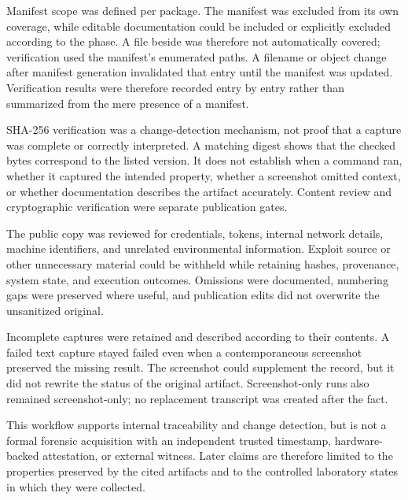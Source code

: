 Manifest scope was defined per package. The manifest was excluded from its own
coverage, while editable documentation could be included or explicitly
excluded according to the phase. A file beside
 was therefore not automatically covered;
verification used the manifest's enumerated paths. A filename or object change
after manifest generation invalidated that entry until the manifest was updated.
Verification results were therefore recorded entry by entry rather than
summarized from the mere presence of a manifest.

SHA-256 verification was a change-detection mechanism, not proof that a capture
was complete or correctly interpreted. A matching digest shows that the checked
bytes correspond to the listed version. It does not establish when a command
ran, whether it captured the intended property, whether a screenshot omitted
context, or whether documentation describes the artifact accurately. Content
review and cryptographic verification were separate publication gates.

The public copy was reviewed for credentials, tokens, internal network details,
machine identifiers, and unrelated environmental information. Exploit source
or other unnecessary material could be withheld while retaining hashes,
provenance, system state, and execution outcomes. Omissions were documented,
numbering gaps were preserved where useful, and publication edits did not
overwrite the unsanitized original.

Incomplete captures were retained and described according to their contents. A
failed text capture stayed failed even when a contemporaneous screenshot
preserved the missing result. The screenshot could supplement the record, but
it did not rewrite the status of the original artifact. Screenshot-only runs
also remained screenshot-only; no replacement transcript was created after the
fact.

This workflow supports internal traceability and change detection, but is not a
formal forensic acquisition with an independent trusted timestamp,
hardware-backed attestation, or external witness. Later claims are therefore
limited to the properties preserved by the cited artifacts and to the
controlled laboratory states in which they were collected.